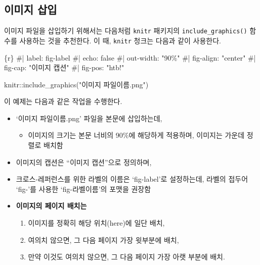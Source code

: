 \documentclass[
  letterpaper,
]{book}
\newenvironment{Shaded}{\begin{snugshade}}{\end{snugshade}}
\newcommand{\InformationTok}[1]{\textcolor[rgb]{0.37,0.37,0.37}{#1}}
\providecommand{\tightlist}{%
  \setlength{\itemsep}{0pt}\setlength{\parskip}{0pt}}\usepackage{longtable,booktabs,array}
\begin{document}
\hypertarget{uxc774uxbbf8uxc9c0-uxc0bduxc785}{%
\subsection{이미지 삽입}\label{uxc774uxbbf8uxc9c0-uxc0bduxc785}}

이미지 파일을 삽입하기 위해서는 다음처럼 \texttt{knitr}
패키지의 \texttt{include\_graphics()} 함수를
사용하는 것을 추천한다. 이 때, \texttt{knitr} 청크는 다음과 같이
사용한다.

\begin{Shaded}
\begin{Highlighting}[]
\InformationTok{\textasciigrave{}\textasciigrave{}\textasciigrave{}\{r\}}
\InformationTok{\#| label: fig{-}label}
\InformationTok{\#| echo: false}
\InformationTok{\#| out{-}width: "90\%"}
\InformationTok{\#| fig{-}align: "center"}
\InformationTok{\#| fig{-}cap: "이미지 캡션"}
\InformationTok{\#| fig{-}pos: "htb!"}

\InformationTok{knitr::include\_graphics("이미지 파일이름.png")}
\InformationTok{\textasciigrave{}\textasciigrave{}\textasciigrave{}}
\end{Highlighting}
\end{Shaded}

이 예제는 다음과 같은 작업을 수행한다.

\begin{itemize}
\tightlist
\item
  `이미지 파일이름.png' 파일을 본문에 삽입하는데,

  \begin{itemize}
  \tightlist
  \item
    이미지의 크기는 본문 너비의 90\%에 해당하게 적용하며, 이미지는
    가운데 정렬로 배치함
  \end{itemize}
\item
  이미지의 캡션은 ``이미지 캡션''으로 정의하며,
\item
  크로스-레퍼런스를 위한 라벨의 이름은 `fig-label'로 설정하는데, 라벨의
  접두어 `fig-'를 사용한 `fig-라벨이름'의 포맷을 권장함
\item
  \textbf{이미지의 페이지 배치는}

  \begin{enumerate}
  \def\labelenumi{\arabic{enumi}.}
  \tightlist
  \item
    이미지를 정확히 해당 위치(here)에 일단 배치,
  \item
    여의치 않으면, 그 다음 페이지 가장 윗부분에 배치,
  \item
    만약 이것도 여의치 않으면, 그 다음 페이지 가장 아랫 부분에 배치.
  \end{enumerate}
\end{itemize}
\end{document}
